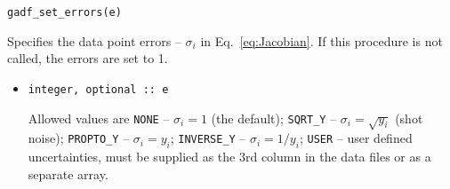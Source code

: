 \documentclass{article}
\begin{document}
\begin{verbatim}
gadf_set_errors(e)
\end{verbatim}
Specifies the data point errors -- $\sigma_i$ in Eq.~\eqref{eq:Jacobian}. If this procedure is not called, the errors are set to 1.
\begin{itemize}
\item
\begin{verbatim}
integer, optional :: e
\end{verbatim}
  Allowed values are \verb+NONE+ -- $\sigma_i = 1$ (the default); \verb+SQRT_Y+ -- $\sigma_i = \sqrt{y_i}$ (shot noise); \verb+PROPTO_Y+ -- $\sigma_i = y_i$; \verb+INVERSE_Y+ -- $\sigma_i = 1/y_i$; \verb+USER+ -- user defined uncertainties, must be supplied as the 3rd column in the data files or as a separate array.
\end{itemize}
\end{document}

